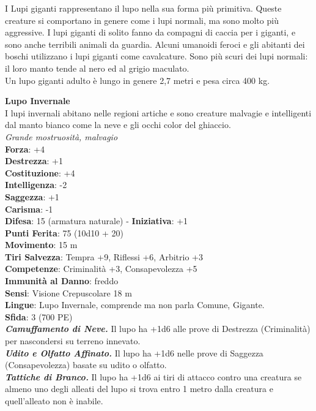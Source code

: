 \begin{multicols}{2}
I Lupi giganti rappresentano il lupo nella sua forma più primitiva. Queste creature si comportano in genere come i lupi normali, ma sono molto più aggressive. I lupi giganti di solito fanno da compagni di caccia per i giganti, e sono anche terribili animali da guardia. Alcuni umanoidi feroci e gli abitanti dei boschi utilizzano i lupi giganti come cavalcature. Sono più scuri dei lupi normali: il loro manto tende al nero ed al grigio maculato.\\

Un lupo giganti adulto è lungo in genere 2,7 metri e pesa circa 400 kg. 

\medskip\textbf{Lupo Invernale}\\
I lupi invernali abitano nelle regioni artiche e sono creature malvagie e intelligenti dal manto bianco come la neve e gli occhi color del ghiaccio.\\
\emph{Grande mostruosità, malvagio}\\
\textbf{Forza}: +4\\
\textbf{Destrezza}: +1\\
\textbf{Costituzione}: +4\\
\textbf{Intelligenza}: -2\\
\textbf{Saggezza}: +1\\
\textbf{Carisma}: -1\\
\textbf{Difesa}: 15 (armatura naturale) - \textbf{Iniziativa}: +1\\
\textbf{Punti Ferita}: 75 (10d10 + 20)\\
\textbf{Movimento}: 15 m\\
\textbf{Tiri Salvezza}: Tempra +9, Riflessi +6, Arbitrio +3 \\
\textbf{Competenze}: Criminalità +3, Consapevolezza +5\\
\textbf{Immunità al Danno}: freddo\\
\textbf{Sensi}: Visione Crepuscolare 18 m\\
\textbf{Lingue}:  Lupo Invernale, comprende ma non parla Comune, Gigante. \\
\textbf{Sfida}: 3 (700 PE)\smallskip\\
\emph{\textbf{Camuffamento di Neve.}} Il lupo ha +1d6 alle prove di Destrezza (Criminalità) per nascondersi su terreno innevato.\\
\emph{\textbf{Udito e Olfatto Affinato.}} Il lupo ha +1d6 nelle prove di Saggezza (Consapevolezza) basate su udito o olfatto.\\
\emph{\textbf{Tattiche di Branco.}} Il lupo ha +1d6 ai tiri di attacco contro una creatura se almeno uno degli alleati del lupo si trova entro 1 metro dalla creatura e quell'alleato non è inabile.\\

\end{multicols}
